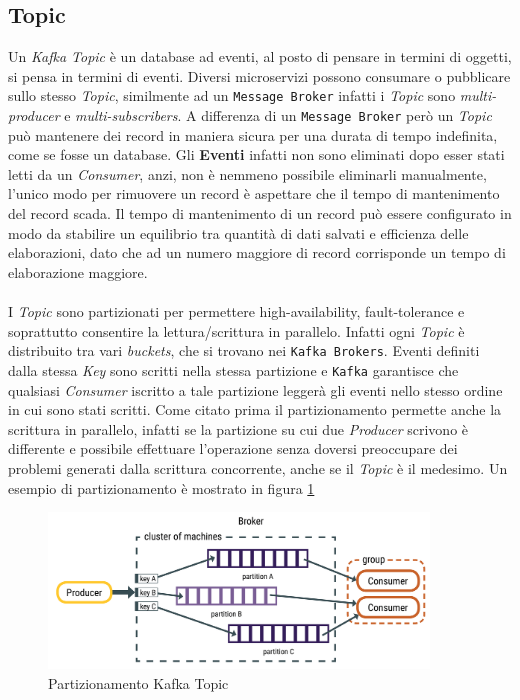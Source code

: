 \subsection{Topic}
\label{subsec:kafka_topics}
Un \textit{Kafka Topic} è un database ad eventi, al posto di pensare in termini di oggetti, si pensa in termini di eventi.
Diversi microservizi possono consumare o pubblicare sullo stesso \textit{Topic}, similmente ad un \texttt{Message Broker} infatti i \textit{Topic} sono \textit{multi-producer} e \textit{multi-subscribers}.
A differenza di un \texttt{Message Broker} però un \textit{Topic} può mantenere dei record in maniera sicura per una durata di tempo indefinita, come se fosse un database.
Gli \textbf{Eventi} infatti non sono eliminati dopo esser stati letti da un \textit{Consumer}, anzi, non è nemmeno possibile eliminarli manualmente, l'unico modo per rimuovere un record è aspettare che il tempo di mantenimento del record scada.
Il tempo di mantenimento di un record può essere configurato in modo da stabilire un equilibrio tra quantità di dati salvati e efficienza delle elaborazioni, dato che ad un numero maggiore di record corrisponde un tempo di elaborazione maggiore.\\\\
I \textit{Topic} sono partizionati per permettere high-availability, fault-tolerance e soprattutto consentire la lettura/scrittura in parallelo.
Infatti ogni \textit{Topic} è distribuito tra vari \textit{buckets}, che si trovano nei \texttt{Kafka Brokers}.
Eventi definiti dalla stessa \textit{Key} sono scritti nella stessa partizione e \texttt{Kafka} garantisce che qualsiasi \textit{Consumer} iscritto a tale partizione leggerà gli eventi nello stesso ordine in cui sono stati scritti.
Come citato prima il partizionamento permette anche la scrittura in parallelo, infatti se la partizione su cui due \textit{Producer} scrivono è differente e possibile effettuare l'operazione senza doversi preoccupare dei problemi generati dalla scrittura concorrente, anche se il \textit{Topic} è il medesimo.
Un esempio di partizionamento è mostrato in figura \ref{fig:kafka_topic}
\begin{figure}[htbp]
    \centering
    \includegraphics[width=0.9\textwidth]{images/kafka/topic.png}
    \caption{Partizionamento Kafka Topic}
    \label{fig:kafka_topic}
\end{figure}

